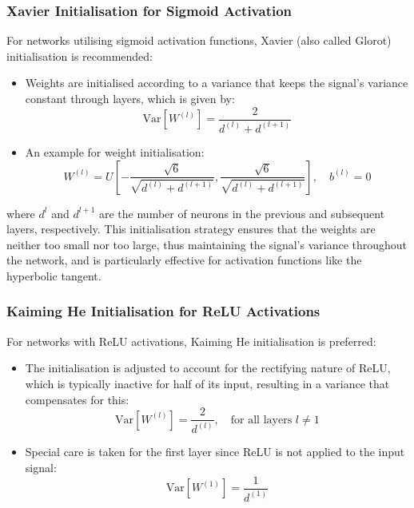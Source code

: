 \subsubsection*{Xavier Initialisation for Sigmoid Activation}
For networks utilising sigmoid activation functions, Xavier (also called Glorot) initialisation is recommended:
\begin{itemize}
    \item Weights are initialised according to a variance that keeps the signal's variance constant through layers, which is given by:
    \begin{equation}
        \text{Var}[W^{(l)}] = \frac{2}{d^{(l)}+d^{(l+1)}}
    \end{equation}
    \item An example for weight initialisation:
    \begin{equation}
        W^{(l)} = U\left[-\frac{\sqrt{6}}{\sqrt{d^{(l)}+d^{(l+1)}}}, \frac{\sqrt{6}}{\sqrt{d^{(l)}+d^{(l+1)}}}\right], \quad b^{(l)} = 0
    \end{equation}
\end{itemize}
where \(d^{l}\) and \(d^{l+1}\) are the number of neurons in the previous and subsequent layers, respectively. This initialisation strategy ensures that the weights are neither too small nor too large, thus maintaining the signal's variance throughout the network, and is particularly effective for activation functions like the hyperbolic tangent.\\

\subsubsection*{Kaiming He Initialisation for ReLU Activations}
For networks with ReLU activations, Kaiming He initialisation is preferred:
\begin{itemize}
    \item The initialisation is adjusted to account for the rectifying nature of ReLU, which is typically inactive for half of its input, resulting in a variance that compensates for this:
    \begin{equation}
        \text{Var}[W^{(l)}] = \frac{2}{d^{(l)}}, \quad \text{for all layers } l \neq 1
    \end{equation}
    \item Special care is taken for the first layer since ReLU is not applied to the input signal:
    \begin{equation}
        \text{Var}[W^{(1)}] = \frac{1}{d^{(1)}}
    \end{equation}
\end{itemize}



